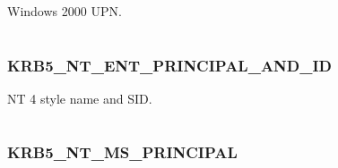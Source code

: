 \documentclass[letterpaper,10pt,english]{sphinxmanual}
\begin{document}
\begin{fulllineitems}
\label{appdev/refs/macros/KRB5_NT_ENTERPRISE_PRINCIPAL:KRB5_NT_ENTERPRISE_PRINCIPAL}
\end{fulllineitems}


Windows 2000 UPN.

\begin{tabulary}{\linewidth}{|L|L|}
\hline

 & 
\\
\hline\end{tabulary}



\subsubsection{KRB5\_NT\_ENT\_PRINCIPAL\_AND\_ID}
\label{appdev/refs/macros/KRB5_NT_ENT_PRINCIPAL_AND_ID:krb5-nt-ent-principal-and-id-data}\label{appdev/refs/macros/KRB5_NT_ENT_PRINCIPAL_AND_ID::doc}\label{appdev/refs/macros/KRB5_NT_ENT_PRINCIPAL_AND_ID:krb5-nt-ent-principal-and-id}

\begin{fulllineitems}
\label{appdev/refs/macros/KRB5_NT_ENT_PRINCIPAL_AND_ID:KRB5_NT_ENT_PRINCIPAL_AND_ID}
\end{fulllineitems}


NT 4 style name and SID.

\begin{tabulary}{\linewidth}{|L|L|}
\hline

 & 
\\
\hline\end{tabulary}



\subsubsection{KRB5\_NT\_MS\_PRINCIPAL}
\label{appdev/refs/macros/KRB5_NT_MS_PRINCIPAL::doc}\label{appdev/refs/macros/KRB5_NT_MS_PRINCIPAL:krb5-nt-ms-principal}\label{appdev/refs/macros/KRB5_NT_MS_PRINCIPAL:krb5-nt-ms-principal-data}

\begin{fulllineitems}
\label{appdev/refs/macros/KRB5_NT_MS_PRINCIPAL:KRB5_NT_MS_PRINCIPAL}
\end{fulllineitems}
\end{document}
